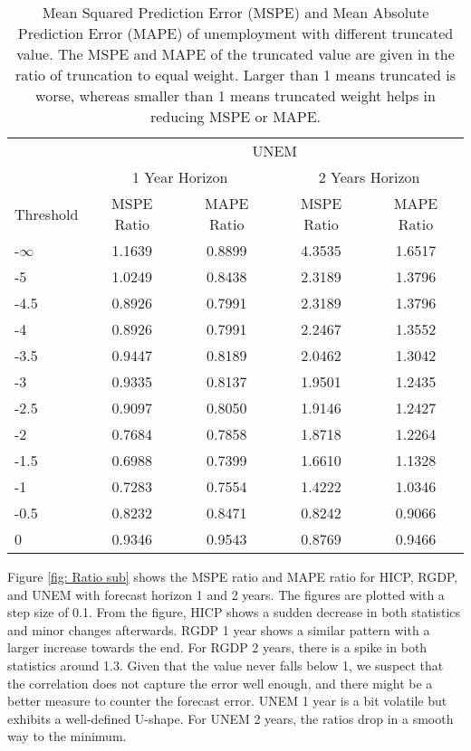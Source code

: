 \documentclass[11pt]{article}
\begin{document}
\begin{table}[!h] 
	\centering
	\caption{Mean Squared Prediction Error (MSPE) and Mean Absolute Prediction Error (MAPE) of unemployment with different truncated value. The MSPE and MAPE of the truncated value are given in the ratio of truncation to equal weight. Larger than 1 means truncated is worse, whereas smaller than 1 means truncated weight helps in reducing MSPE or MAPE.}
	\label{tab: MSPE UNEM}
	\begin{tabular}{lcccc}
		\hline
		& \multicolumn{4}{c}{UNEM}                                                \\
		\cmidrule(lr){2-5}
		& \multicolumn{2}{c}{1 Year Horizon} & \multicolumn{2}{c}{2 Years Horizon} \\
		\cmidrule(lr){2-3} \cmidrule(lr){4-5}
		Threshold & MSPE Ratio &    MAPE Ratio    & MSPE Ratio &    MAPE Ratio    \\ \hline
		\hline
		-$\infty$ & 1.1639 & 0.8899 & 4.3535 & 1.6517\\ 
		-5 & 1.0249 & 0.8438 & 2.3189 & 1.3796\\ 
		-4.5 & 0.8926 & 0.7991 & 2.3189 & 1.3796\\ 
		-4 & 0.8926 & 0.7991 & 2.2467 & 1.3552\\ 
		-3.5 & 0.9447 & 0.8189 & 2.0462 & 1.3042\\ 
		-3 & 0.9335 & 0.8137 & 1.9501 & 1.2435\\ 
		-2.5 & 0.9097 & 0.8050 & 1.9146 & 1.2427\\ 
		-2 & 0.7684 & 0.7858 & 1.8718 & 1.2264\\ 
		-1.5 & 0.6988 & 0.7399 & 1.6610 & 1.1328\\ 
		-1 & 0.7283 & 0.7554 & 1.4222 & 1.0346\\ 
		-0.5 & 0.8232 & 0.8471 & 0.8242 & 0.9066\\ 
		0 & 0.9346 & 0.9543 & 0.8769 & 0.9466\\ \hline
	\end{tabular}
\end{table}



Figure \ref{fig: Ratio sub} shows the MSPE ratio and MAPE ratio for HICP, RGDP, and UNEM with forecast horizon 1 and 2 years. The figures are plotted with a step size of 0.1. From the figure, HICP shows a sudden decrease in both statistics and minor changes afterwards. RGDP 1 year shows a similar pattern with a larger increase towards the end. For RGDP 2 years, there is a spike in both statistics around 1.3. Given that the value never falls below 1, we suspect that the correlation does not capture the error well enough, and there might be a better measure to counter the forecast error. UNEM 1 year is a bit volatile but exhibits a well-defined U-shape. For UNEM 2 years, the ratios drop in a smooth way to the minimum.
\end{document}
